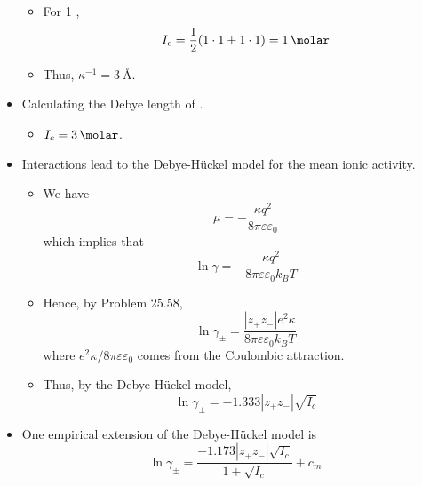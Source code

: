 \documentclass[../notes.tex]{subfiles}
\begin{document}
\begin{itemize}
\begin{itemize}
        \item For \SI{1}{\molar} ,
        \begin{equation*}
            I_c = \frac{1}{2}(1\cdot 1+1\cdot 1) = \SI{1}{\molar}
        \end{equation*}
        \item Thus, $\kappa^{-1}=\SI{3}{\angstrom}$.
    \end{itemize}
    \item Calculating the Debye length of .
    \begin{itemize}
        \item $I_c=\SI{3}{\molar}$.
    \end{itemize}
    \item Interactions lead to the Debye-H\"{u}ckel model for the mean ionic activity.
    \begin{itemize}
        \item We have
        \begin{equation*}
            \mu = -\frac{\kappa q^2}{8\pi\varepsilon\varepsilon_0}
        \end{equation*}
        which implies that
        \begin{equation*}
            \ln\gamma = -\frac{\kappa q^2}{8\pi\varepsilon\varepsilon_0k_BT}
        \end{equation*}
        \item Hence, by Problem 25.58,
        \begin{equation*}
            \ln\gamma_\pm = \frac{|z_+z_-|e^2\kappa}{8\pi\varepsilon\varepsilon_0k_BT}
        \end{equation*}
        where $e^2\kappa/8\pi\varepsilon\varepsilon_0$ comes from the Coulombic attraction.
        \item Thus, by the Debye-H\"{u}ckel model,
        \begin{equation*}
            \ln\gamma_\pm = -1.333|z_+z_-|\sqrt{I_c}
        \end{equation*}
    \end{itemize}
    \item One empirical extension of the Debye-H\"{u}ckel model is
    \begin{equation*}
        \ln\gamma_\pm = \frac{-1.173|z_+z_-|\sqrt{I_c}}{1+\sqrt{I_c}}+c_m
    \end{equation*}
\end{itemize}
\end{document}
